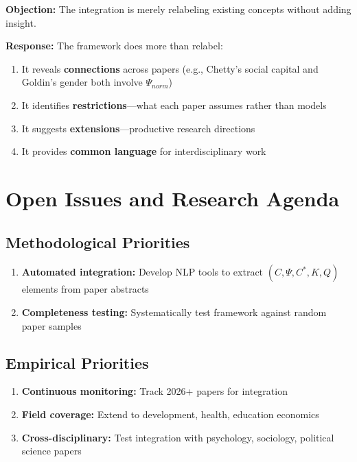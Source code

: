 \textbf{Objection:} The integration is merely relabeling existing concepts
without adding insight.

\textbf{Response:} The framework does more than relabel:
\begin{enumerate}
    \item It reveals \textbf{connections} across papers (e.g., Chetty's
          social capital and Goldin's gender both involve $\Psi_{norm}$)
    \item It identifies \textbf{restrictions}---what each paper assumes
          rather than models
    \item It suggests \textbf{extensions}---productive research directions
    \item It provides \textbf{common language} for interdisciplinary work
\end{enumerate}


\section{Open Issues and Research Agenda}
\label{sec:J-open}

\subsection{Methodological Priorities}

\begin{enumerate}
    \item \textbf{Automated integration:} Develop NLP tools to extract
        $(C, \Psi, C^*, K, Q)$ elements from paper abstracts
    \item \textbf{Completeness testing:} Systematically test framework
        against random paper samples
\end{enumerate}

\subsection{Empirical Priorities}

\begin{enumerate}
    \item \textbf{Continuous monitoring:} Track 2026+ papers for integration
    \item \textbf{Field coverage:} Extend to development, health, education
        economics
    \item \textbf{Cross-disciplinary:} Test integration with psychology,
        sociology, political science papers
\end{enumerate}


